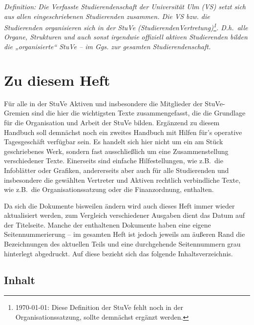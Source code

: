 

\textit{Definition: Die Verfasste Studierendenschaft der Universität Ulm (VS) setzt sich aus allen eingeschriebenen Studierenden zusammen.
Die VS bzw. die Studierenden organisieren sich in der StuVe (StudierendenVertretung)\footnote{\today: Diese Definition der StuVe fehlt noch in der Organisationssatzung, sollte demnächst ergänzt werden.}.
D.h.\ alle Organe, Strukturen und auch sonst irgendwie offiziell aktiven Studierenden bilden die „organisierte“ StuVe – im Ggs. zur gesamten Studierendenschaft.}


\section*{Zu diesem Heft}


Für alle in der StuVe Aktiven und insbesondere die Mitglieder der StuVe-Gremien sind die hier die wichtigsten Texte zusammengefasst, die die Grundlage für die Organisation und Arbeit der StuVe bilden. Ergänzend zu diesem Handbuch soll demnächst noch ein zweites Handbuch mit Hilfen für's operative Tagesgeschäft verfügbar sein.
Es handelt sich hier nicht um ein am Stück geschriebenes Werk, sondern fast ausschließlich um eine Zusammenstellung verschiedener Texte.
Einerseits sind einfache Hilfestellungen, wie z.B.\ die Infoblätter oder Grafiken, andererseits aber auch für alle Studierenden und insbesondere die gewählten Vertreter und Aktiven rechtlich verbindliche Texte, wie z.B.\ die Organisationssatzung oder die Finanzordnung, enthalten.

Da sich die Dokumente bisweilen ändern wird auch dieses Heft immer wieder aktualisiert werden, zum Vergleich verschiedener Ausgaben dient das Datum auf der Titelseite.
Manche der enthaltenen Dokumente haben eine eigene Seitennummerierung – im gesamten Heft ist jedoch jeweils am äußeren Rand die Bezeichnungen des aktuellen Teils und eine durchgehende Seitennummern grau hinterlegt abgedruckt. Auf diese bezieht sich das folgende Inhaltsverzeichnis.


\subsection*{Inhalt}

